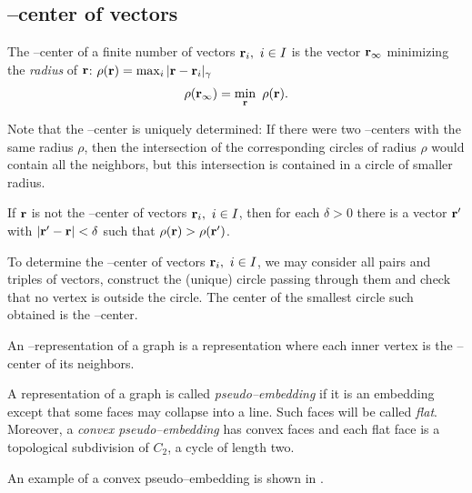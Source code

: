 \documentclass[invmat]{svjour}
\begin{document}
\subsection{\M--center of vectors}
\label{s:M_center}
\begin{definition}[Radius]
The \M--center of a finite number of vectors $\mathbf{r}_i,\ i \in I$ is the
vector $\mathbf{r}_{\infty}$ minimizing the \emph{radius} of $\mathbf{r}$:
$\rho(\mathbf{r}) = \max_{i} |\mathbf{r} - \mathbf{r}_i|_{\gamma}$
\begin{equation*}
\rho(\mathbf{r}_{\infty}) = \min_{\mathbf{r}}\ \rho(\mathbf{r}).
\label{d:centers}
\end{equation*}
\end{definition}
Note that the \M--center is uniquely determined: If there were two
\M--centers with the same radius $\rho$, then the intersection of the
corresponding circles of radius $\rho$ would contain all the neighbors,
but this  intersection is contained in a circle of smaller radius.

\begin{lemma}
\label{l:no_local}
If $\mathbf{r}$ is not the \M--center of vectors $\mathbf{r}_i,\ i \in I$, then
for each $\delta > 0$ there is a vector $\mathbf{r}'$ with $|\mathbf{r}' - \mathbf{r}|
< \delta$ such that $\rho(\mathbf{r}) >  \rho(\mathbf{r}')$.
\label{l:cinf_center}
\end{lemma}
To determine the \M--center of vectors $\mathbf{r}_i,\ i\in I$, we may
consider all pairs and triples of vectors, construct the (unique) circle
passing through them and check that no vertex is outside the circle.
The center of the smallest circle such obtained is the \M--center.

\begin{definition}[\M--representation]
\label{d:m_representation}
An \M--representation of a graph is a representation where each
inner vertex is the \M--center of its neighbors.
\end{definition}

\begin{definition}
\label{d:pseudo_embedding}
A representation of a graph is called {\em pseudo--embedding} if it
is an embedding except that some faces may collapse into a line.
Such faces will be called \emph{flat}.
Moreover, a \emph{convex pseudo--embedding} has convex faces and each flat
face is a topological subdivision of $C_2$, a cycle of length two.
\end{definition}
An example of a convex pseudo--embedding is shown in .
\end{document}
